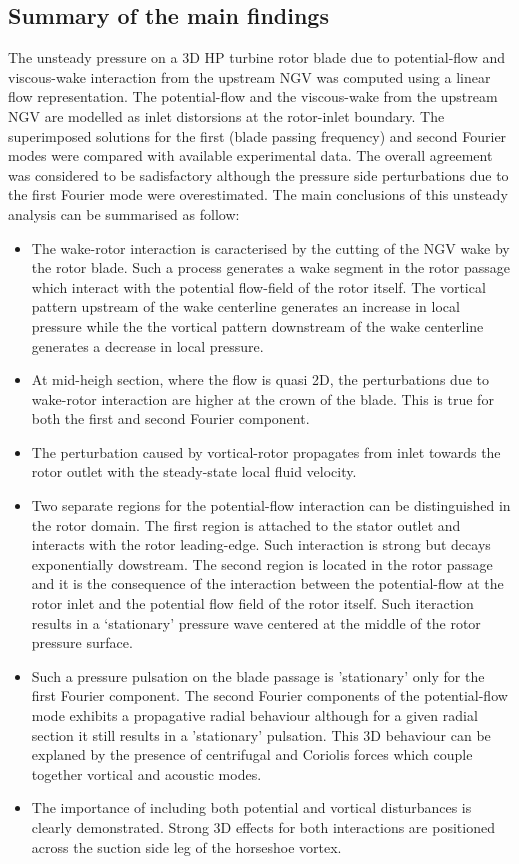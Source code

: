 \subsection{Summary of the main findings}
%
 The unsteady pressure on a 3D HP turbine rotor blade due
 to potential-flow and viscous-wake
 interaction from the upstream NGV was computed using a linear
 flow representation.
 The potential-flow and the viscous-wake from the upstream
 NGV are modelled as inlet distorsions at the rotor-inlet boundary.
 The superimposed solutions for the first (blade passing
 frequency) and second Fourier modes were compared with
 available experimental data. The overall agreement
 was considered to be sadisfactory although the pressure
 side perturbations due to the first Fourier mode were
 overestimated.
 The main conclusions of this unsteady analysis can be summarised
 as follow:
%
\begin{itemize}
%
\item
 The wake-rotor interaction is caracterised by the cutting of
 the NGV wake by the rotor blade. Such a process generates a wake
 segment in the rotor passage which interact with the potential
 flow-field of the rotor itself. The vortical pattern upstream of the
 wake centerline generates an increase in local pressure while
 the the vortical pattern downstream of the wake centerline
 generates a decrease in local pressure.
%
\item
 At mid-heigh section, where the flow is quasi 2D, the perturbations
 due to wake-rotor interaction are higher at the crown of the blade.
 This is true for both the first and second Fourier component.
%
\item
 The perturbation caused by vortical-rotor propagates from inlet towards
 the rotor outlet with the steady-state local fluid velocity.
%
\item
 Two separate regions for the potential-flow interaction can be
 distinguished in the rotor domain. The first region is attached to the stator
 outlet and interacts with the rotor leading-edge. Such interaction is strong
 but decays exponentially dowstream.
 The second region is located in the rotor passage and it is the consequence of
 the interaction between the potential-flow at the rotor inlet and the potential
 flow field of the rotor itself. Such iteraction results in a `stationary'
 pressure wave centered at the middle of the rotor pressure surface.
%
\item
 Such a pressure pulsation on the blade passage is 'stationary' only for
 the first Fourier component. The second Fourier components of the
 potential-flow mode exhibits a propagative radial behaviour although
 for a given radial section it still results in a 'stationary' pulsation.
 This 3D behaviour can be explaned by the presence of
 centrifugal and Coriolis forces which couple together vortical
 and acoustic modes.
%
\item
 The importance of including both potential and vortical disturbances is clearly
 demonstrated. Strong 3D effects for both interactions are
 positioned across the suction side leg of the horseshoe vortex.
%
\end{itemize}
%

